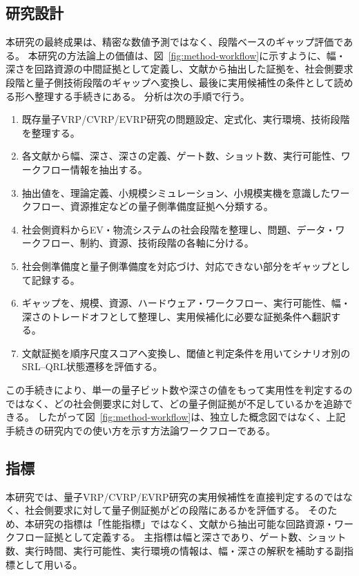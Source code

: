 \subsection{研究設計}

本研究の最終成果は、精密な数値予測ではなく、段階ベースのギャップ評価である。
本研究の方法論上の価値は、図~\ref{fig:method-workflow}に示すように、幅・深さを回路資源の中間証拠として定義し、文献から抽出した証拠を、社会側要求段階と量子側技術段階のギャップへ変換し、最後に実用候補性の条件として読める形へ整理する手続きにある。
分析は次の手順で行う。

\begin{enumerate}
  \item 既存量子VRP/CVRP/EVRP研究の問題設定、定式化、実行環境、技術段階を整理する。
  \item 各文献から幅、深さ、深さの定義、ゲート数、ショット数、実行可能性、ワークフロー情報を抽出する。
  \item 抽出値を、理論定義、小規模シミュレーション、小規模実機を意識したワークフロー、資源推定などの量子側準備度証拠へ分類する。
  \item 社会側資料からEV・物流システムの社会段階を整理し、問題、データ・ワークフロー、制約、資源、技術段階の各軸に分ける。
  \item 社会側準備度と量子側準備度を対応づけ、対応できない部分をギャップとして記録する。
  \item ギャップを、規模、資源、ハードウェア・ワークフロー、実行可能性、幅・深さのトレードオフとして整理し、実用候補化に必要な証拠条件へ翻訳する。
  \item 文献証拠を順序尺度スコアへ変換し、閾値と判定条件を用いてシナリオ別のSRL--QRL状態遷移を評価する。
\end{enumerate}

この手続きにより、単一の量子ビット数や深さの値をもって実用性を判定するのではなく、どの社会側要求に対して、どの量子側証拠が不足しているかを追跡できる。
したがって図~\ref{fig:method-workflow}は、独立した概念図ではなく、上記手続きの研究内での使い方を示す方法論ワークフローである。

\subsection{指標}

本研究では、量子VRP/CVRP/EVRP研究の実用候補性を直接判定するのではなく、社会側要求に対して量子側証拠がどの段階にあるかを評価する。
そのため、本研究の指標は「性能指標」ではなく、文献から抽出可能な回路資源・ワークフロー証拠として定義する。
主指標は幅と深さであり、ゲート数、ショット数、実行時間、実行可能性、実行環境の情報は、幅・深さの解釈を補助する副指標として用いる。

